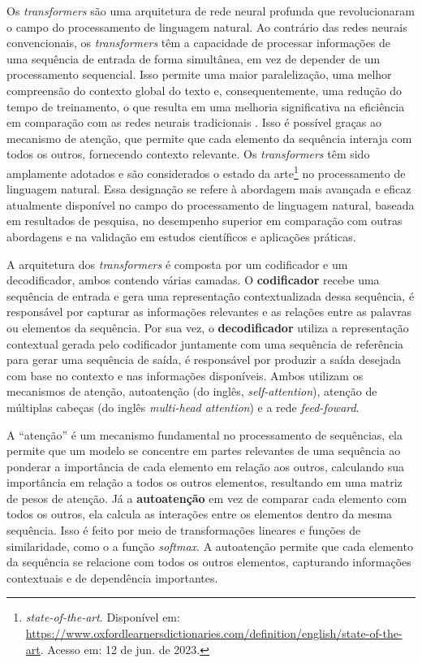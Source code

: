 Os \textit{transformers} são uma arquitetura de rede neural profunda que revolucionaram o campo do processamento de linguagem natural. Ao contrário das redes neurais convencionais, os \textit{transformers} têm a capacidade de processar informações de uma sequência de entrada de forma simultânea, em vez de depender de um processamento sequencial. Isso permite uma maior paralelização, uma melhor compreensão do contexto global do texto e, consequentemente, uma redução do tempo de treinamento, o que resulta em uma melhoria significativa na eficiência em comparação com as redes neurais tradicionais \cite{GoogleTeamTransformers}. Isso é possível graças ao mecanismo de atenção, que permite que cada elemento da sequência interaja com todos os outros, fornecendo contexto relevante. Os \textit{transformers} têm sido amplamente adotados e são considerados o estado da arte\footnote{\textit{state-of-the-art}. Disponível em: \url{https://www.oxfordlearnersdictionaries.com/definition/english/state-of-the-art}. Acesso em: 12 de jun. de 2023.} no processamento de linguagem natural. Essa designação se refere à abordagem mais avançada e eficaz atualmente disponível no campo do processamento de linguagem natural, baseada em resultados de pesquisa, no desempenho superior em comparação com outras abordagens e na validação em estudos científicos e aplicações práticas.

A arquitetura dos \textit{transformers} é composta por um codificador e um decodificador, ambos contendo várias camadas. O \textbf{codificador} recebe uma sequência de entrada e gera uma representação contextualizada dessa sequência, é responsável por capturar as informações relevantes e as relações entre as palavras ou elementos da sequência. Por sua vez, o \textbf{decodificador} utiliza a representação contextual gerada pelo codificador juntamente com uma sequência de referência para gerar uma sequência de saída, é responsável por produzir a saída desejada com base no contexto e nas informações disponíveis. Ambos utilizam os mecanismos de atenção, autoatenção (do inglês, \textit{self-attention}), atenção de múltiplas cabeças (do inglês \textit{multi-head attention}) e a rede \textit{feed-foward}.

A ``atenção'' é um mecanismo fundamental no processamento de sequências, ela permite que um modelo se concentre em partes relevantes de uma sequência ao ponderar a importância de cada elemento em relação aos outros, calculando sua importância em relação a todos os outros elementos, resultando em uma matriz de pesos de atenção. Já a \textbf{autoatenção} em vez de comparar cada elemento com todos os outros, ela calcula as interações entre os elementos dentro da mesma sequência. Isso é feito por meio de transformações lineares e funções de similaridade, como o a função \textit{softmax}. A autoatenção permite que cada elemento da sequência se relacione com todos os outros elementos, capturando informações contextuais e de dependência importantes. 

